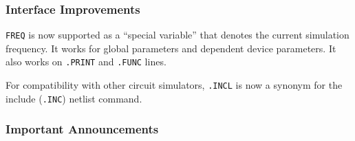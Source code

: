 \documentclass[letterpaper]{scrartcl}
\begin{document}
\subsubsection*{Interface Improvements}
\begin{XyceItemize}
\item \texttt{FREQ} is now supported as a ``special variable'' that denotes
  the current simulation frequency.  It works for global parameters and
  dependent device parameters.  It also works on \texttt{.PRINT} and
  \texttt{.FUNC} lines.
\item For compatibility with other circuit simulators, \texttt{.INCL}
  is now a synonym for the include (\texttt{.INC}) netlist command.
\end{XyceItemize}

\subsubsection*{Important Announcements}
\end{document}
